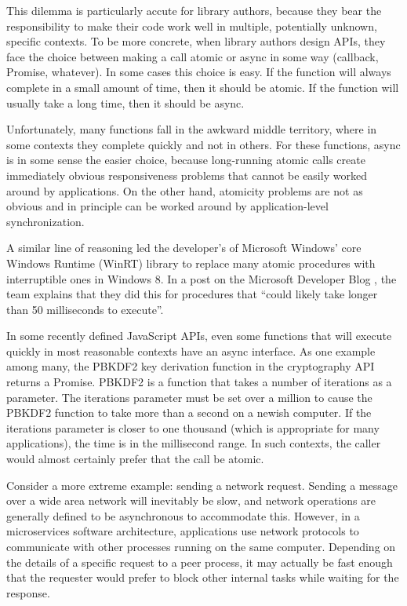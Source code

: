 \documentclass[acmsmall,anonymous,review]{acmart}\settopmatter{printfolios=true,printccs=false,printacmref=false}
\begin{document}
This dilemma is particularly accute for library authors, because they bear the responsibility to make their code work well in multiple, potentially unknown, specific contexts.
To be more concrete, when library authors design APIs, they face the choice between making a call atomic or async in some way (callback, Promise, whatever).
In some cases this choice is easy.
If the function will always complete in a small amount of time, then it should be atomic.
If the function will usually take a long time, then it should be async.

Unfortunately, many functions fall in the awkward middle territory, where in some contexts they complete quickly and not in others.
For these functions, async is in some sense the easier choice, because long-running atomic calls create immediately obvious responsiveness problems that cannot be easily worked around by applications.
On the other hand, atomicity problems are not as obvious and in principle can be worked around by application-level synchronization.

A similar line of reasoning led the developer's of Microsoft Windows' core Windows Runtime (WinRT) library to replace many atomic procedures with interruptible ones in Windows 8.
In a post on the Microsoft Developer Blog \cite{Windows8Team2012}, the team explains that they did this for procedures that ``could likely take longer than 50 milliseconds to execute''.

In some recently defined JavaScript APIs, even some functions that will execute quickly in most reasonable contexts have an async interface.
As one example among many, the PBKDF2 key derivation function in the cryptography API returns a Promise.
PBKDF2 is a function that takes a number of iterations as a parameter.
The iterations parameter must be set over a million to cause the PBKDF2 function to take more than a second on a newish computer.
If the iterations parameter is closer to one thousand (which is appropriate for many applications), the time is in the millisecond range.
In such contexts, the caller would almost certainly prefer that the call be atomic.

Consider a more extreme example: sending a network request.
Sending a message over a wide area network will inevitably be slow, and network operations are generally defined to be asynchronous to accommodate this.
However, in a microservices software architecture, applications use network protocols to communicate with other processes running on the same computer.
Depending on the details of a specific request to a peer process, it may actually be fast enough that the requester would prefer to block other internal tasks while waiting for the response.
\end{document}
